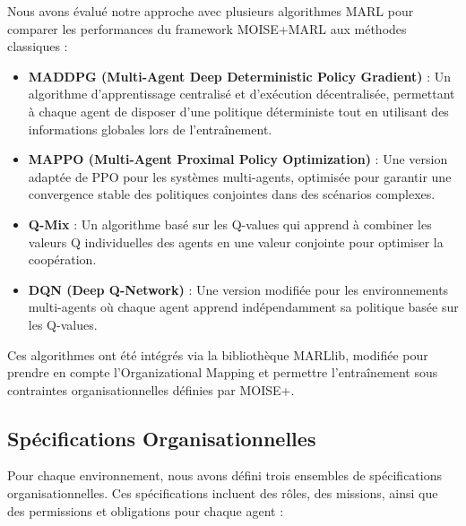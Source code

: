 \documentclass[sigconf,anonymous]{aamas}
\begin{document}
Nous avons évalué notre approche avec plusieurs algorithmes MARL pour comparer les performances du framework MOISE+MARL aux méthodes classiques :

\begin{itemize}
    \item \textbf{MADDPG (Multi-Agent Deep Deterministic Policy Gradient)} \cite{lowe2017multi}: Un algorithme d'apprentissage centralisé et d'exécution décentralisée, permettant à chaque agent de disposer d'une politique déterministe tout en utilisant des informations globales lors de l'entraînement.
    
    \item \textbf{MAPPO (Multi-Agent Proximal Policy Optimization)} \cite{yu2021mappo}: Une version adaptée de PPO pour les systèmes multi-agents, optimisée pour garantir une convergence stable des politiques conjointes dans des scénarios complexes.
    
    \item \textbf{Q-Mix} \cite{rashid2018qmix}: Un algorithme basé sur les Q-values qui apprend à combiner les valeurs Q individuelles des agents en une valeur conjointe pour optimiser la coopération.
    
    \item \textbf{DQN (Deep Q-Network)} \cite{mnih2015dqn}: Une version modifiée pour les environnements multi-agents où chaque agent apprend indépendamment sa politique basée sur les Q-values.
\end{itemize}

Ces algorithmes ont été intégrés via la bibliothèque MARLlib, modifiée pour prendre en compte l'Organizational Mapping et permettre l'entraînement sous contraintes organisationnelles définies par MOISE+.

\subsection{Spécifications Organisationnelles}

Pour chaque environnement, nous avons défini trois ensembles de spécifications organisationnelles. Ces spécifications incluent des rôles, des missions, ainsi que des permissions et obligations pour chaque agent :
\end{document}
